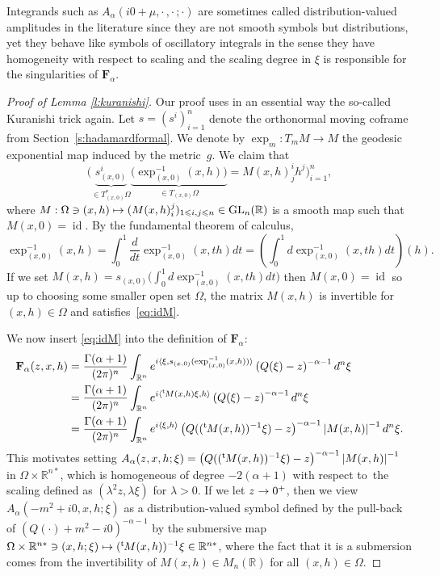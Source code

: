 \documentclass[JEP,XML,SOM,Unicode]{cedram}
\def\mto{\mathchoice{\longmapsto}{\mapsto}{\mapsto}{\mapsto}}
\theoremstyle{definition}
\newenvironment{refproof}[1]{\begin{proof}[Proof of {#1}]}{\end{proof}}
\newcommand{\GL}{\mathrm{GL}}
\let\cv\alpha
\let\Im\relax
\DeclareMathOperator{\Im}{Im}
\DeclareMathOperator\id{id}
\newcommand{\module}[1]{\left|#1\right|}
\renewcommand{\sec}[1]{Section~\ref{#1}}
\renewcommand{\t}{{{}^{\mathrm{t}\mkern-2mu}}}
\begin{document}
Integrands such as $A_\cv(i0+\mu,\cdot\,,\cdot\,;\cdot)$ are sometimes called distribution-valued amplitudes in the literature since they are not smooth symbols but distributions, yet they behave like symbols of oscillatory integrals in the sense they have homogeneity with respect to scaling and the scaling degree in $\xi$ is responsible for the singularities of $\mathbf{F}_\cv$.

\begin{refproof}{Lemma \ref{l:kuranishi}}
Our proof uses in an essential way the so-called Kuranishi trick again.
Let $s=(s^i)_{i=1}^n$ denote the orthonormal moving {coframe} from
\sec{s:hadamardformal}.
We denote by $\exp_{m}:T_mM\to M$ the geodesic exponential
map induced by the metric~$g$.
We claim that
\begin{equation}\label{eq:idM}
\Big(\underset{\in T^*_{(x,0)}\Omega}{\underbrace{s^i_{(x,0)}}}
\underset{\in T_{(x,0)}\Omega}{\underbrace{\bigl(\exp^{-1}_{(x,0)}(x,h)\bigr)}}= M(x,h)^i_jh^j\Big)_{i=1}^n,
\end{equation}
where
$M:\Omega \ni (x,h)\mto (M(x,h)_i^j)_{1\leqslant i,j\leqslant n}\in \GL_n(\mathbb{R})$ is a smooth map
such that $M(x,0)=\id$.
By the fundamental theorem of calculus,
\[
\exp^{-1}_{(x,0)}(x,h)=\int_{0}^1 \frac{d}{dt} \exp^{-1}_{(x,0)}(x,th) dt =\left(\int_{0}^1 d\exp^{-1}_{(x,0)}(x,th) dt\right)(h).
\]
If we set $M(x,h)=s_{(x,0)}\bigl(\int_{0}^1 d\exp^{-1}_{(x,0)}(x,th) dt\bigr)$ then $M(x,0)=\id$
so up to choosing some smaller open set $\Omega$, the matrix $M(x,h)$ is
invertible for $(x,h)\in \Omega$ and satisfies~\eqref{eq:idM}.

We now insert \eqref{eq:idM} into the definition of $\mathbf{F}_\cv$:
\[
\begin{aligned}
\mathbf{F}_\cv(z,x,h)&=\frac{\Gamma(\cv+1)}{(2\pi)^n}\int_{\mathbb{R}^n} e^{i\langle\xi,s_{(x,0)}(\exp^{-1}_{(x,0)}(x,h))\rangle} \left(Q(\xi)-z \right)^{-\cv-1} d^n\xi\\
&=\frac{\Gamma(\cv+1)}{(2\pi)^n}\int_{\mathbb{R}^n} e^{i\langle \t M(x,h)\xi,h\rangle} \left(Q(\xi)-z \right)^{-\cv-1} d^n\xi
\\
&=\frac{\Gamma(\cv+1)}{(2\pi)^n}\int_{\mathbb{R}^n} e^{i\left\langle \xi,h\right\rangle} \left(Q((\t M(x,h))^{-1}\xi)-z \right)^{-\cv-1} \module{M(x,h)}^{-1} d^n\xi.
\end{aligned}
\]
This motivates setting
$A_\cv(z,x,h;\xi)=\left(Q((\t M(x,h))^{-1}\xi)-z \right)^{-\cv-1} \module{M(x,h)}^{-1}$
in $\Omega\times \mathbb{R}^{n*}$, which is homogeneous of degree $-2(\cv+1)$ with respect to~the scaling defined as $(\lambda^2z,\lambda\xi)$ for $\lambda>0$. If we let $\Im z\to 0^+$, then we view $A_\cv(-m^2+i0,x,h;\xi)$ as a distribution-valued symbol defined by the pull-back of
$\left(Q(\cdot)+m^2-i0\right)^{-\cv-1}$ by the submersive map
$\Omega\times \mathbb{R}^{n*} \ni (x,h;\xi) \mto (\t M(x,h))^{-1}\xi\in \mathbb{R}^{n*}$, where the fact that it is a submersion comes from the invertibility of $M(x,h)\in M_n(\mathbb{R})$ for all $(x,h)\in \Omega$.


\end{refproof}
\end{document}
